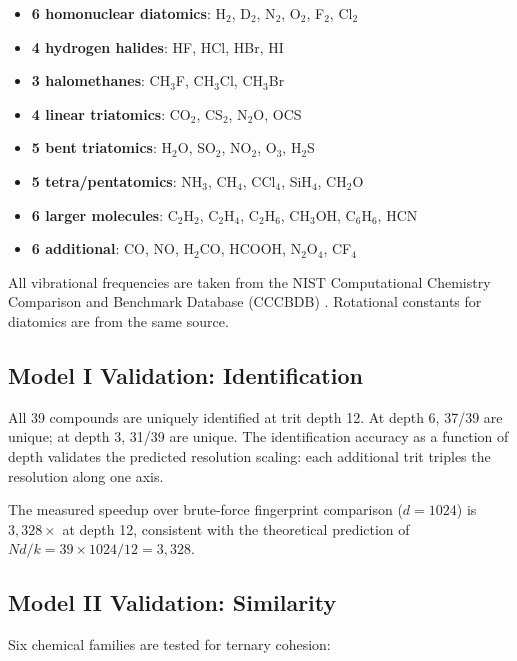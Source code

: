 \documentclass[11pt,twocolumn,a4paper]{article}
\theoremstyle{definition}
\theoremstyle{remark}
\begin{document}
\begin{itemize}[nosep]
\item \textbf{6 homonuclear diatomics}: H$_2$, D$_2$, N$_2$, O$_2$, F$_2$, Cl$_2$
\item \textbf{4 hydrogen halides}: HF, HCl, HBr, HI
\item \textbf{3 halomethanes}: CH$_3$F, CH$_3$Cl, CH$_3$Br
\item \textbf{4 linear triatomics}: CO$_2$, CS$_2$, N$_2$O, OCS
\item \textbf{5 bent triatomics}: H$_2$O, SO$_2$, NO$_2$, O$_3$, H$_2$S
\item \textbf{5 tetra/pentatomics}: NH$_3$, CH$_4$, CCl$_4$, SiH$_4$, CH$_2$O
\item \textbf{6 larger molecules}: C$_2$H$_2$, C$_2$H$_4$, C$_2$H$_6$, CH$_3$OH, C$_6$H$_6$, HCN
\item \textbf{6 additional}: CO, NO, H$_2$CO, HCOOH, N$_2$O$_4$, CF$_4$
\end{itemize}

All vibrational frequencies are taken from the NIST Computational Chemistry Comparison and Benchmark Database (CCCBDB) \citep{johnson2022}. Rotational constants for diatomics are from the same source.

\subsection{Model I Validation: Identification}

All 39 compounds are uniquely identified at trit depth 12. At depth 6, 37/39 are unique; at depth 3, 31/39 are unique. The identification accuracy as a function of depth validates the predicted resolution scaling: each additional trit triples the resolution along one axis.

The measured speedup over brute-force fingerprint comparison ($d = 1024$) is $3{,}328\times$ at depth 12, consistent with the theoretical prediction of $Nd/k = 39 \times 1024 / 12 = 3{,}328$.

\subsection{Model II Validation: Similarity}

Six chemical families are tested for ternary cohesion:
\end{document}
